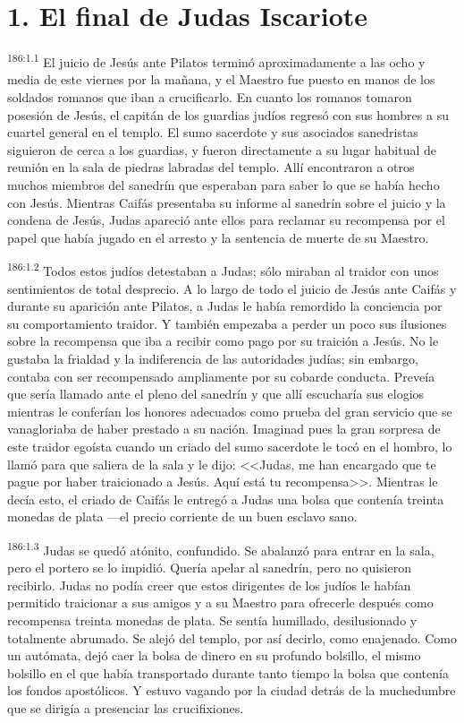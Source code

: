 \section*{1. El final de Judas Iscariote}
\par 
\textsuperscript{186:1.1} El juicio de Jesús ante Pilatos terminó aproximadamente a las ocho y media de este viernes por la mañana, y el Maestro fue puesto en manos de los soldados romanos que iban a crucificarlo. En cuanto los romanos tomaron posesión de Jesús, el capitán de los guardias judíos regresó con sus hombres a su cuartel general en el templo. El sumo sacerdote y sus asociados sanedristas siguieron de cerca a los guardias, y fueron directamente a su lugar habitual de reunión en la sala de piedras labradas del templo. Allí encontraron a otros muchos miembros del sanedrín que esperaban para saber lo que se había hecho con Jesús. Mientras Caifás presentaba su informe al sanedrín sobre el juicio y la condena de Jesús, Judas apareció ante ellos para reclamar su recompensa por el papel que había jugado en el arresto y la sentencia de muerte de su Maestro.

\par 
\textsuperscript{186:1.2} Todos estos judíos detestaban a Judas; sólo miraban al traidor con unos sentimientos de total desprecio. A lo largo de todo el juicio de Jesús ante Caifás y durante su aparición ante Pilatos, a Judas le había remordido la conciencia por su comportamiento traidor. Y también empezaba a perder un poco sus ilusiones sobre la recompensa que iba a recibir como pago por su traición a Jesús. No le gustaba la frialdad y la indiferencia de las autoridades judías; sin embargo, contaba con ser recompensado ampliamente por su cobarde conducta. Preveía que sería llamado ante el pleno del sanedrín y que allí escucharía sus elogios mientras le conferían los honores adecuados como prueba del gran servicio que se vanagloriaba de haber prestado a su nación. Imaginad pues la gran sorpresa de este traidor egoísta cuando un criado del sumo sacerdote le tocó en el hombro, lo llamó para que saliera de la sala y le dijo: <<Judas, me han encargado que te pague por haber traicionado a Jesús. Aquí está tu recompensa>>. Mientras le decía esto, el criado de Caifás le entregó a Judas una bolsa que contenía treinta monedas de plata ---el precio corriente de un buen esclavo sano.

\par 
\textsuperscript{186:1.3} Judas se quedó atónito, confundido. Se abalanzó para entrar en la sala, pero el portero se lo impidió. Quería apelar al sanedrín, pero no quisieron recibirlo. Judas no podía creer que estos dirigentes de los judíos le habían permitido traicionar a sus amigos y a su Maestro para ofrecerle después como recompensa treinta monedas de plata. Se sentía humillado, desilusionado y totalmente abrumado. Se alejó del templo, por así decirlo, como enajenado. Como un autómata, dejó caer la bolsa de dinero en su profundo bolsillo, el mismo bolsillo en el que había transportado durante tanto tiempo la bolsa que contenía los fondos apostólicos. Y estuvo vagando por la ciudad detrás de la muchedumbre que se dirigía a presenciar las crucifixiones.

